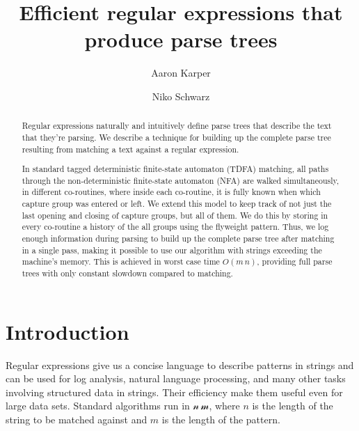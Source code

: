 \documentclass[11pt,a4paper,twoside,openright]{Thesis}
\author{Aaron Karper \and Niko Schwarz}
\theoremstyle{definition}
\begin{document}
\setlength{\pdfpageheight}{\paperheight}
\setlength{\pdfpagewidth}{\paperwidth}

\newcommand{\abs}[1]{\left|#1\right|}

\frenchspacing

\title{Efficient regular expressions that produce parse trees}

\maketitle

\begin{abstract}
Regular expressions naturally and intuitively define parse trees that describe
the text that they're parsing.  We describe a technique for building up the
complete parse tree resulting from matching a text against a regular
expression.

In standard tagged deterministic finite-state automaton (TDFA) matching, all
paths through the non-deterministic finite-state automaton (NFA) are walked
simultaneously, in different co-routines, where inside each co-routine, it is
fully known when which capture group was entered or left. We extend this model
to keep track of not just the last opening and closing of capture groups, but
all of them. We do this by storing in every co-routine a history of the all
groups using the flyweight pattern. Thus, we log enough information during
parsing to build up the complete parse tree after matching in a single pass, 
making it possible to use our algorithm with strings exceeding the machine's
memory. This is achieved in  worst case time $O(m\,n)$, providing full parse 
trees with only constant slowdown compared to matching.
\end{abstract}

\tableofcontents

\chapter{Introduction}

Regular expressions give us a concise language to describe patterns in 
strings and can be used for log analysis, natural language processing, and 
many other tasks involving structured data in strings. Their efficiency make 
them useful even for large data sets. Standard algorithms run in 
$\mathcal{n\, m}$, where $n$ is the length of the string to be matched 
against and $m$ is the length of the pattern\cite{Sedg90a}.
\end{document}
